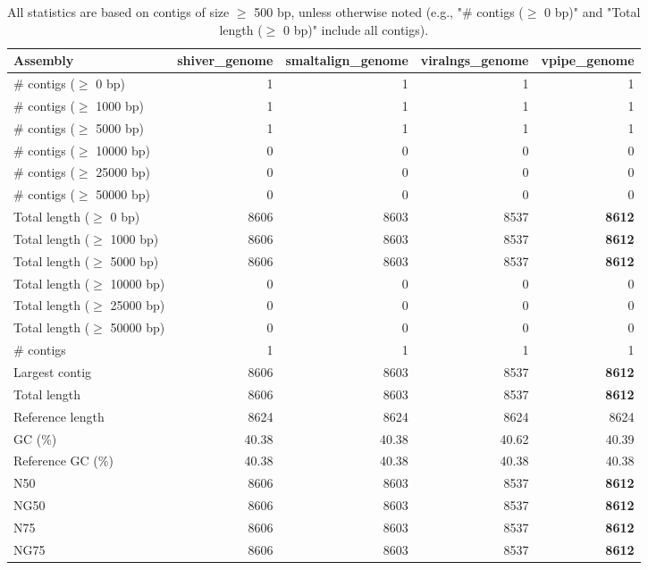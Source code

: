 \documentclass[12pt,a4paper]{article}
\begin{document}
\begin{table}[ht]
\begin{center}
\caption{All statistics are based on contigs of size $\geq$ 500 bp, unless otherwise noted (e.g., "\# contigs ($\geq$ 0 bp)" and "Total length ($\geq$ 0 bp)" include all contigs).}
\begin{tabular}{|l*{4}{|r}|}
\hline
Assembly & shiver\_genome & smaltalign\_genome & viralngs\_genome & vpipe\_genome \\ \hline
\# contigs ($\geq$ 0 bp) & 1 & 1 & 1 & 1 \\ \hline
\# contigs ($\geq$ 1000 bp) & 1 & 1 & 1 & 1 \\ \hline
\# contigs ($\geq$ 5000 bp) & 1 & 1 & 1 & 1 \\ \hline
\# contigs ($\geq$ 10000 bp) & 0 & 0 & 0 & 0 \\ \hline
\# contigs ($\geq$ 25000 bp) & 0 & 0 & 0 & 0 \\ \hline
\# contigs ($\geq$ 50000 bp) & 0 & 0 & 0 & 0 \\ \hline
Total length ($\geq$ 0 bp) & 8606 & 8603 & 8537 & {\bf 8612} \\ \hline
Total length ($\geq$ 1000 bp) & 8606 & 8603 & 8537 & {\bf 8612} \\ \hline
Total length ($\geq$ 5000 bp) & 8606 & 8603 & 8537 & {\bf 8612} \\ \hline
Total length ($\geq$ 10000 bp) & 0 & 0 & 0 & 0 \\ \hline
Total length ($\geq$ 25000 bp) & 0 & 0 & 0 & 0 \\ \hline
Total length ($\geq$ 50000 bp) & 0 & 0 & 0 & 0 \\ \hline
\# contigs & 1 & 1 & 1 & 1 \\ \hline
Largest contig & 8606 & 8603 & 8537 & {\bf 8612} \\ \hline
Total length & 8606 & 8603 & 8537 & {\bf 8612} \\ \hline
Reference length & 8624 & 8624 & 8624 & 8624 \\ \hline
GC (\%) & 40.38 & 40.38 & 40.62 & 40.39 \\ \hline
Reference GC (\%) & 40.38 & 40.38 & 40.38 & 40.38 \\ \hline
N50 & 8606 & 8603 & 8537 & {\bf 8612} \\ \hline
NG50 & 8606 & 8603 & 8537 & {\bf 8612} \\ \hline
N75 & 8606 & 8603 & 8537 & {\bf 8612} \\ \hline
NG75 & 8606 & 8603 & 8537 & {\bf 8612} \\ \hline

\end{tabular}
\end{center}
\end{table}
\end{document}

